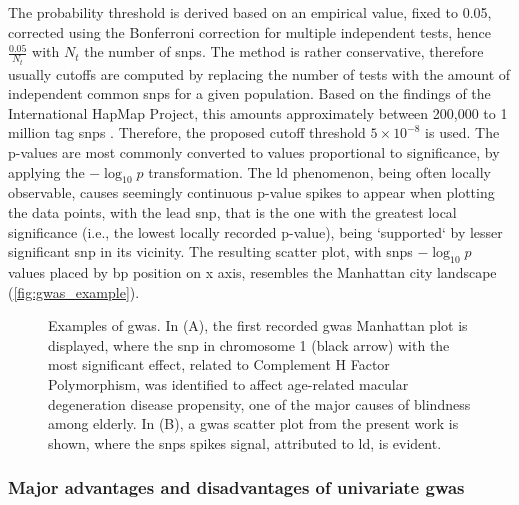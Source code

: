 The probability threshold is derived based on an empirical value, fixed to 0.05, corrected using the Bonferroni correction for multiple independent tests, hence $\frac{0.05}{N_t}$ with $N_t$ the number of \acp{snp}. The method is rather conservative, therefore usually cutoffs are computed by replacing the number of tests with the amount of independent common \acp{snp} for a given population. Based on the findings of the International HapMap Project, this amounts approximately between 200,000 to 1 million tag \acp{snp} \cite{Belmont2003}. Therefore, the proposed cutoff threshold $5\times 10 ^ {-8}$ is used. The p-values are most commonly converted to values proportional to significance, by applying the $-\log_{10}{p}$ transformation.   The \ac{ld} phenomenon, being often locally observable, causes seemingly continuous p-value spikes to appear when plotting the data points, with the lead \ac{snp}, that is the one with the greatest local significance (i.e., the lowest locally recorded p-value), being `supported` by lesser significant \ac{snp} in its vicinity. The resulting scatter plot, with \acp{snp} $-\log_{10}{p}$ values placed by bp position on x axis, resembles the Manhattan city landscape (\autoref{fig:gwas_example}).

 \begin{figure}[H]
 	\centering
	\subfloat[]{
		
		\label{fig:gwas_example}
	}
	\caption[Examples of \acs{gwas} Manhattan plots \cite{Klein2005}]{Examples of \ac{gwas}. In (A), the first recorded \ac{gwas} Manhattan plot \cite{Klein2005} is displayed, where the \ac{snp} in chromosome 1 (black arrow) with the most significant  effect, related to Complement H Factor Polymorphism, was identified to affect age-related macular degeneration disease propensity, one of the major causes of blindness among elderly. In (B), a \ac{gwas} scatter plot from the present work is shown, where the \acp{snp} spikes signal, attributed to \ac{ld}, is evident.}
\end{figure}

\subsubsection{Major advantages and disadvantages of univariate \ac{gwas}}

